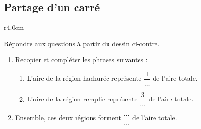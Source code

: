 
\subsection*{Partage d'un carré}

\begin{wrapfigure}[2]{r}{4.0cm}
   \vspace{-0.5cm}        %
   \centering
   
\end{wrapfigure}

Répondre aux questions à partir du dessin ci-contre.
\begin{enumerate}
    \item
        Recopier et compléter les phrases suivantes :
        \begin{enumerate}
            \item
                L'aire de la région hachurée représente \( \dfrac{ 1 }{ \ldots }\) de l'aire totale.
            \item
                L'aire de la région remplie représente \( \dfrac{ 3 }{ \ldots }\) de l'aire totale.
        \end{enumerate}
    \item
        Ensemble, ces deux régions forment \( \dfrac{ \ldots }{ \ldots }\) de l'aire totale.
\end{enumerate}
